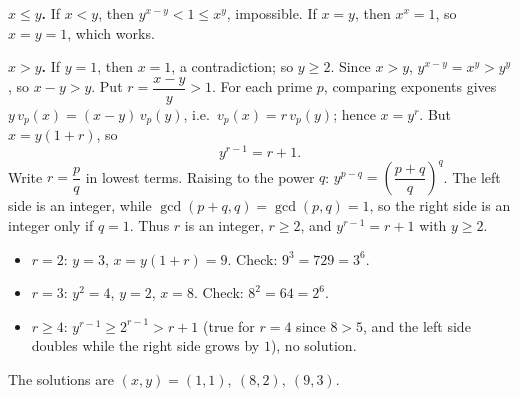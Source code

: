 \textbf{$x\le y$.} If $x<y$, then $y^{x-y}<1\le x^y$, impossible. If $x=y$, then $x^x=1$, so $x=y=1$, which works.

\textbf{$x>y$.} If $y=1$, then $x=1$, a contradiction; so $y\ge2$. Since $x>y$, $y^{x-y}=x^y>y^y$, so $x-y>y$. Put $r=\dfrac{x-y}{y}>1$. For each prime $p$, comparing exponents gives $y\,v_p(x)=(x-y)\,v_p(y)$, i.e.\ $v_p(x)=r\,v_p(y)$; hence $x=y^r$. But $x=y(1+r)$, so
\[
y^{r-1}=r+1 .
\]
Write $r=\dfrac {p}{q}$ in lowest terms. Raising to the power $q$: $y^{p-q}=\left(\dfrac{p+q}{q}\right)^q$. The left side is an integer, while $\gcd(p+q,q)=\gcd(p,q)=1$, so the right side is an integer only if $q=1$. Thus $r$ is an integer, $r\ge2$, and $y^{r-1}=r+1$ with $y\ge2$.
\begin{itemize}
\item $r=2$: $y=3$, $x=y(1+r)=9$. Check: $9^3=729=3^6$.
\item $r=3$: $y^2=4$, $y=2$, $x=8$. Check: $8^2=64=2^6$.
\item $r\ge4$: $y^{r-1}\ge2^{r-1}>r+1$ (true for $r=4$ since $8>5$, and the left side doubles while the right side grows by $1$), no solution.
\end{itemize}
The solutions are $\boxed{(x,y)=(1,1),\ (8,2),\ (9,3)}$.
